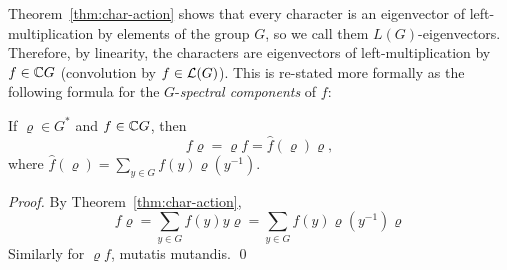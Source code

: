 Theorem~\ref{thm:char-action} shows that every character is
an eigenvector of left-multiplication by elements of the
group $G$, so we call them $L(G)$-eigenvectors.
Therefore, by linearity, the characters are eigenvectors
of left-multiplication by $f\in \mathbb{C} G$ (convolution by
$f\in \mathcal{L}(G)$).  This is re-stated more formally as the following
formula for the $G$-\emph{spectral components} of $f$:
\begin{corollary}\label{cor:FT}
If $\varrho\in G^*$ and $f\in \mathbb{C} G$, then
\begin{equation}\label{eq:FT}
f\varrho = \varrho f = \hat{f}(\varrho)\varrho,
\end{equation}
where $\hat{f}(\varrho) = \sum_{y\in G} f(y) \varrho(y^{-1})$.
\end{corollary}
\begin{proof}
By Theorem~\ref{thm:char-action},
\begin{equation}
f\varrho = \sum_{y\in G} f(y) y\varrho =  \sum_{y\in G} f(y)\varrho(y^{-1}) \varrho
\end{equation}
Similarly for $\varrho f$, mutatis mutandis.
\qed
\end{proof}

